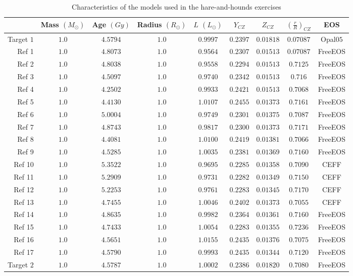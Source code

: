 \documentclass[a4paper,fleqn,usenatbib]{mnras}
\begin{document}
\begin{table*}
\caption{Characteristics of the models used in the hare-and-hounds exercises}
\label{tabHoundsProp}
  \centering
\begin{tabular}{r | c | c | c | c | c | c | c | c}
\hline
& Mass $(M_{\odot})$  & Age $(Gy)$ & Radius $(R_{\odot})$ & $L$ $(L_{\odot})$ & $Y_{CZ}$ & $Z_{CZ}$ & $\left(\frac{r}{R}\right)_{CZ}$ & EOS\\ \hline
Target $1$ & $1.0$ & $4.5794$ & $1.0$ & $0.9997$ & $0.2397$ &$0.01818$&$0.07087$&Opal$05$\\
Ref 1 & $1.0$ & $4.8073$ & $1.0$ & $0.9564$ & $0.2307$ & $0.01513$&$0.07087$&FreeEOS\\  
Ref 2 & $1.0$&  $4.8038$ & $1.0$& $0.9558$& $0.2294$ &$0.01513$&$0.7125$
&FreeEOS\\  
Ref 3 & $1.0$& $4.5097$ & $1.0$& $0.9740$ & $0.2342$ &$0.01513$&$0.716$
&FreeEOS\\
Ref 4 & $1.0$ & $4.2502$ & $1.0$ & $0.9933$ & $0.2421$&$0.01513$&$0.7068$&FreeEOS\\
Ref 5 & $1.0$ & $4.4130$ & $1.0$ & $1.0107$ &$0.2455$& $0.01373$&$0.7161$
&FreeEOS\\
Ref 6 & $1.0$ & $5.0004$ &$1.0$ & $0.9749$ & $0.2301$& $0.01375$&$0.7087$&FreeEOS\\
Ref 7 & $1.0$ & $4.8743$ &$1.0$ & $0.9817$ & $0.2300$& $0.01373$&$0.7171$&FreeEOS\\
Ref 8 & $1.0$ & $4.4081$ &$1.0$ & $1.0100$ & $0.2419$& $0.01381$&$0.7066$&FreeEOS\\
Ref 9 & $1.0$ & $4.5285$ &$1.0$ & $1.0035$ & $0.2381$& $0.01369$&$0.7160$&FreeEOS\\
Ref 10 & $1.0$ & $5.3522$ &$1.0$ & $0.9695$ & $0.2285$& $0.01358$&$0.7090$&CEFF\\
Ref 11 & $1.0$ & $5.2909$ &$1.0$ & $0.9731$ & $0.2282$& $0.01349$&$0.7150$&CEFF\\
Ref 12 & $1.0$ & $5.2253$ &$1.0$ & $0.9761$ & $0.2283$& $0.01345$&$0.7170$&CEFF\\
Ref 13 & $1.0$ & $4.7455$ &$1.0$ & $1.0046$ & $0.2402$& $0.01373$&$0.7055$&CEFF\\
Ref 14 & $1.0$ & $4.8635$ &$1.0$ & $0.9982$ & $0.2364$& $0.01361$&$0.7160$&FreeEOS\\
Ref 15 & $1.0$ & $4.7433$ &$1.0$ & $1.0054$ & $0.2283$& $0.01355$&$0.7236$&FreeEOS\\
Ref 16 & $1.0$ & $4.5651$ &$1.0$ & $1.0155$ & $0.2435$& $0.01376$&$0.7075$&FreeEOS\\
Ref 17 & $1.0$ & $4.5790$ &$1.0$ & $0.9993$ & $0.2435$& $0.01344$&$0.7120$&FreeEOS\\
\hline
Target $2$ & $1.0$ & $4.5787$ & $1.0$ & $1.0002$& $0.2386$ & $0.01820$  & $0.7080$ & FreeEOS \\
\hline
\end{tabular}
\end{table*}
\end{document}
